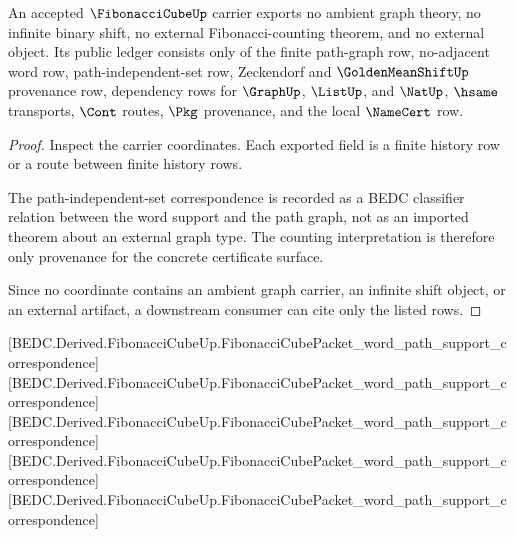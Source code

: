 \begin{theorem}
\label{thm:fibonacci-cube-ledger-non-escape}
An accepted $\FibonacciCubeUp$ carrier exports no ambient graph theory, no infinite binary shift, no external Fibonacci-counting theorem, and no external object. Its public ledger consists only of the finite path-graph row, no-adjacent word row, path-independent-set row, Zeckendorf and $\GoldenMeanShiftUp$ provenance row, dependency rows for $\GraphUp$, $\ListUp$, and $\NatUp$, $\hsame$ transports, $\Cont$ routes, $\Pkg$ provenance, and the local $\NameCert$ row.
\end{theorem}
\begin{proof}
Inspect the carrier coordinates. Each exported field is a finite history row or a route between finite history rows.

The path-independent-set correspondence is recorded as a BEDC classifier relation between the word support and the path graph, not as an imported theorem about an external graph type. The counting interpretation is therefore only provenance for the concrete certificate surface.

Since no coordinate contains an ambient graph carrier, an infinite shift object, or an external artifact, a downstream consumer can cite only the listed rows.
\end{proof}

[BEDC.Derived.FibonacciCubeUp.FibonacciCubePacket\_word\_path\_support\_correspondence]
[BEDC.Derived.FibonacciCubeUp.FibonacciCubePacket\_word\_path\_support\_correspondence]
[BEDC.Derived.FibonacciCubeUp.FibonacciCubePacket\_word\_path\_support\_correspondence]
[BEDC.Derived.FibonacciCubeUp.FibonacciCubePacket\_word\_path\_support\_correspondence]
[BEDC.Derived.FibonacciCubeUp.FibonacciCubePacket\_word\_path\_support\_correspondence]

